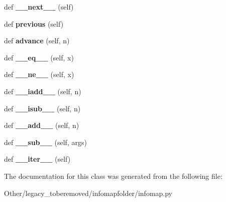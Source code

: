 \begin{DoxyCompactItemize}
def {\bfseries \+\_\+\+\_\+next\+\_\+\+\_\+} (self)
\item 
\mbox{\label{classinfomapfolder_1_1infomap_1_1SwigPyIterator_ac4be0e0d7a7d30149ba5961affdf4582}} 
def {\bfseries previous} (self)
\item 
\mbox{\label{classinfomapfolder_1_1infomap_1_1SwigPyIterator_a0fd0b5512f3724f8226a5892a2802b00}} 
def {\bfseries advance} (self, n)
\item 
\mbox{\label{classinfomapfolder_1_1infomap_1_1SwigPyIterator_a54159828068adf0ea3f60d60fc28e1ce}} 
def {\bfseries \+\_\+\+\_\+eq\+\_\+\+\_\+} (self, x)
\item 
\mbox{\label{classinfomapfolder_1_1infomap_1_1SwigPyIterator_a1397773db60875922a256cc4ec7269f4}} 
def {\bfseries \+\_\+\+\_\+ne\+\_\+\+\_\+} (self, x)
\item 
\mbox{\label{classinfomapfolder_1_1infomap_1_1SwigPyIterator_ad156d34b727a925ed708f2e1b242d8f5}} 
def {\bfseries \+\_\+\+\_\+iadd\+\_\+\+\_\+} (self, n)
\item 
\mbox{\label{classinfomapfolder_1_1infomap_1_1SwigPyIterator_a9a87e2ae8beb4e47daa010464a79eb46}} 
def {\bfseries \+\_\+\+\_\+isub\+\_\+\+\_\+} (self, n)
\item 
\mbox{\label{classinfomapfolder_1_1infomap_1_1SwigPyIterator_ae21ed838d4e2ae906a1f74d5966bb4ba}} 
def {\bfseries \+\_\+\+\_\+add\+\_\+\+\_\+} (self, n)
\item 
\mbox{\label{classinfomapfolder_1_1infomap_1_1SwigPyIterator_a50d7279b77737221d8058688b5106609}} 
def {\bfseries \+\_\+\+\_\+sub\+\_\+\+\_\+} (self, args)
\item 
\mbox{\label{classinfomapfolder_1_1infomap_1_1SwigPyIterator_ab29a6570384fac6a8946bc3bd8afdcb1}} 
def {\bfseries \+\_\+\+\_\+iter\+\_\+\+\_\+} (self)
\end{DoxyCompactItemize}


The documentation for this class was generated from the following file\+:\begin{DoxyCompactItemize}
\item 
Other/legacy\+\_\+toberemoved/infomapfolder/infomap.\+py\end{DoxyCompactItemize}
